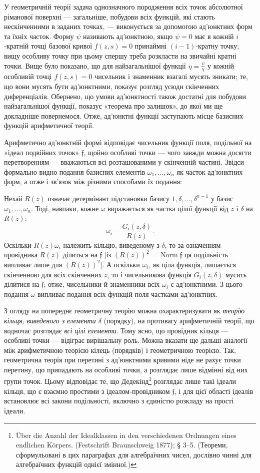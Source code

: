 \documentclass[11pt]{article}
\providecommand{\frf}{\mathfrak f}
\begin{document}
У геометричній теорії задача однозначного породження всіх точок абсолютної ріманової поверхні --- загальніше, побудови всіх функцій, які стають нескінченними в заданих точках, --- виконується за допомогою ад'юнктних форм та їхніх часток. Форму \(\psi\) називають ад'юнктною, якщо \(\psi=0\) має в кожній \(i\)-кратній точці базової кривої \(f(z,s)=0\) принаймні \((i-1)\)-кратну точку; вищу особливу точку при цьому спершу треба розкласти на звичайні кратні точки. Вище було показано, що для найзагальнішої функції \(\eta=\frac{\psi}{\chi}\) у кожній особливій точці \(f(z,s)=0\) чисельник і знаменник взагалі мусять зникати; те, що вони мусять бути ад'юнктними, показує розгляд усюди скінченних диференціалів. Обернено, що умови ад'юнктності також достатні для побудови найзагальнішої функції, показує «теорема про залишок», до якої ми ще докладніше повернемося. Отже, ад'юнктні функції заступають місце базисних функцій арифметичної теорії.

Арифметично ад'юнктній формі відповідає чисельник функції поля, подільної на «ідеал подвійних точок» \(\frf\), щойно особливі точки --- чого завжди можна досягти перетворенням --- вважаються всі розташованими у скінченній частині. Звідси формально видно подання базисних елементів \(\omega_1,\ldots,\omega_n\) як часток ад'юнктних форм, а отже і зв'язок між різними способами їх подання:

Нехай \(R(z)\) означає детермінант підстановки базису \(1,\delta,\ldots,\delta^{n-1}\) у базис \(\omega_1,\ldots,\omega_n\). Тоді, навпаки, кожне \(\omega\) виражається як частка цілої функції від \(z\) і \(\delta\) на \(R(z)\):
\[
\omega_i=\frac{G_i(z,\delta)}{R(z)}.
\]
Оскільки \(R(z)\omega_i\) належить кільцю, виведеному з \(\delta\), то за означенням провідника \(R(z)\) ділиться на \(\frf\) [із \((R(z))^2=\operatorname{Norm}\frf\) ця подільність випливає лише для \((R(z))^2\)]. А оскільки \(\omega_i\), як ціла функція, лишається скінченною для всіх скінченних \(z\), то і чисельникова функція \(G_i(z,\delta)\) мусить ділитися на \(\frf\); отже, чисельники й знаменники всіх \(\omega_i\) є ад'юнктними. З цього подання \(\omega\) випливає подання всіх функцій поля частками ад'юнктних.

З огляду на попереднє геометричну теорію можна охарактеризувати як \emph{теорію кільця, виведеного з елемента \(\delta\)} (порядку), на противагу арифметичній теорії, що водночас розглядає \emph{всі цілі елементи}. Тому ясно, що провідник кільця --- особливі точки --- відіграє вирішальну роль. Можна вказати ще дальші аналогії між арифметичною теорією кілець (порядків) і геометричною теорією. Так, геометрична теорія при перетині з ад'юнктними кривими ніде не рахує точки перетину, що припадають на особливі точки, а розглядає лише відмінні від них групи точок. Цьому відповідає те, що Дедекінд\footnote{Über die Anzahl der Idealklassen in den verschiedenen Ordnungen eines endlichen Körpers. (Festschrift Braunschweig 1877); § 3--5. (Теореми, сформульовані в цих параграфах для алгебраїчних чисел, дослівно чинні для алгебраїчних функцій однієї змінної.)} розглядає лише такі ідеали кільця, що є взаємно простими з ідеалом-провідником \(\frf\), і для цієї області ідеалів встановлює всі закони подільності, включно з єдиністю розкладу на прості ідеали.
\end{document}
